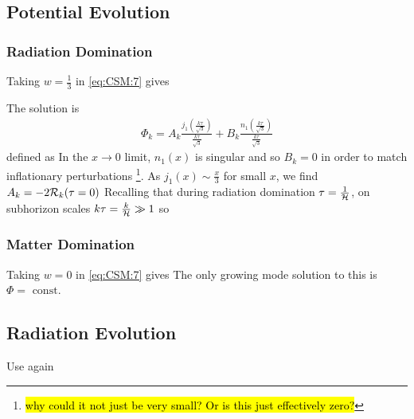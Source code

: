 \documentclass{article}
\begin{document}
\subsection{Potential Evolution}

\subsubsection*{Radiation Domination}
Taking $w=\frac{1}{3}$ in \ref{eq:CSM:7} gives 

The solution is 
\begin{align}\label{eq:CSM:11}
\Phi_k = A_k \frac{j_1(\frac{k\tau}{\sqrt{3}})}{\frac{k\tau}{\sqrt{3}}} + B_k \frac{n_1(\frac{k\tau}{\sqrt{3}})}{\frac{k\tau}{\sqrt{3}}}
\end{align}
defined as 
In the $x \to 0$ limit, $n_1(x)$ is singular and so $B_k = 0$ in order to match inflationary perturbations \footnote{\hl{why could it not just be very small? Or is this just effectively zero?}}. As $j_1(x) \sim \frac{x}{3}$ for small $x$, we find $A_k = -2\mathcal{R}_k(\tau=0) $
Recalling that during radiation domination $\tau = \frac{1}{\mathcal{H}}$, on subhorizon scales $k\tau = \frac{k}{\mathcal{H}} \gg 1$ so 

\subsubsection*{Matter Domination}
Taking $w = 0$ in \ref{eq:CSM:7} gives 
The only growing mode solution to this is $\Phi = \text{ const}$. 


\subsection{Radiation Evolution}

Use again 
\end{document}
